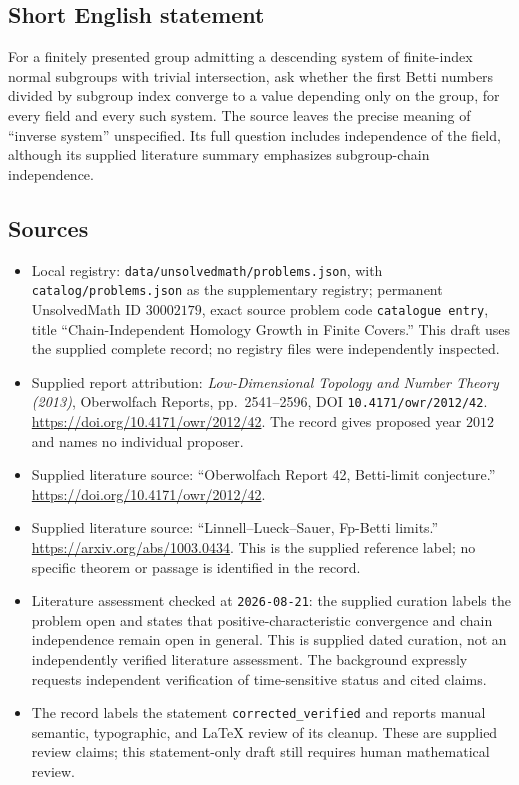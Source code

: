 \documentclass[11pt]{article}
\begin{document}
\subsection{Short English statement}
For a finitely presented group admitting a descending system of finite-index normal subgroups with trivial intersection, ask whether the first Betti numbers divided by subgroup index converge to a value depending only on the group, for every field and every such system. The source leaves the precise meaning of ``inverse system'' unspecified. Its full question includes independence of the field, although its supplied literature summary emphasizes subgroup-chain independence.
\subsection{Sources}
\begin{itemize}
\item Local registry: \texttt{data/unsolvedmath/problems.json}, with \texttt{catalog/problems.json} as the supplementary registry; permanent UnsolvedMath ID \(30002179\), exact source problem code \texttt{catalogue entry}, title ``Chain-Independent Homology Growth in Finite Covers.'' This draft uses the supplied complete record; no registry files were independently inspected.
\item Supplied report attribution: \emph{Low-Dimensional Topology and Number Theory (2013)}, Oberwolfach Reports, pp.~2541--2596, DOI \texttt{10.4171/owr/2012/42}. \url{https://doi.org/10.4171/owr/2012/42}. The record gives proposed year \(2012\) and names no individual proposer.
\item Supplied literature source: ``Oberwolfach Report 42, Betti-limit conjecture.'' \url{https://doi.org/10.4171/owr/2012/42}.
\item Supplied literature source: ``Linnell--Lueck--Sauer, Fp-Betti limits.'' \url{https://arxiv.org/abs/1003.0434}. This is the supplied reference label; no specific theorem or passage is identified in the record.
\item Literature assessment checked at \texttt{2026-08-21}: the supplied curation labels the problem open and states that positive-characteristic convergence and chain independence remain open in general. This is supplied dated curation, not an independently verified literature assessment. The background expressly requests independent verification of time-sensitive status and cited claims.
\item The record labels the statement \texttt{corrected\_verified} and reports manual semantic, typographic, and LaTeX review of its cleanup. These are supplied review claims; this statement-only draft still requires human mathematical review.
\end{itemize}
\end{document}
